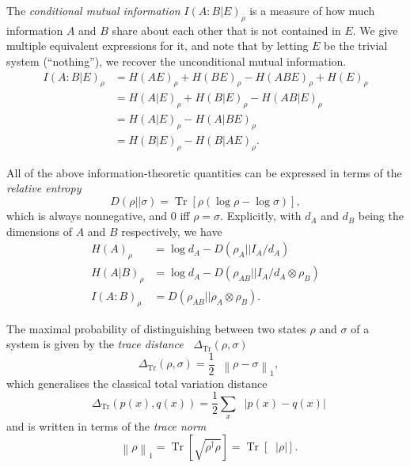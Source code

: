 \documentclass[10pt, a4paper]{article}
\numberwithin{equation}{section} %
\theoremstyle{definition}
\theoremstyle{plain}
\newcommand{\norm}[1]{\mathop{}\left\lVert#1\right\rVert}
\newcommand{\abs}[1]{\mathop{}\left\lvert#1\right\rvert}
\newcommand{\?}{\mathrel{?}} %
\newcommand{\Tr}[2][]{\mathop{\mathrm{Tr}#1}\left[ #2 \right]} %
\newcommand{\Trdist}[2]{\mathop{}\Delta_\mathrm{Tr}\left(#1, #2\right)}
\begin{document}
\begin{appendices}
                  The \emph{conditional mutual information} \(I{(A:B|E)}_{\rho}\) is a measure of how much information \(A\) and \(B\) share about each other that is not contained in \(E\). We give multiple equivalent expressions for it, and note that by letting \(E\) be the trivial system (``nothing''), we recover the unconditional mutual information.
                    \begin{align}
                      I{(A:B|E)}_{\rho} &= H{(AE)}_{\rho} + H{(BE)}_{\rho} - H{(ABE)}_{\rho} + H{(E)}_{\rho} \\
                                        &= H{(A|E)}_{\rho} + H{(B|E)}_{\rho} - H{(AB|E)}_{\rho} \\
                                        &= H{(A|E)}_{\rho} - H{(A|BE)}_{\rho} \\
                                        &= H{(B|E)}_{\rho} - H{(B|AE)}_{\rho}.
                    \end{align}

                  All of the above information-theoretic quantities can be expressed in terms of the \emph{relative entropy}
                  \begin{equation}
                    D(\rho||\sigma) = \Tr{ \rho (\log \rho - \log \sigma) },
                  \end{equation}
                  which is always nonnegative, and 0 iff \(\rho = \sigma\). Explicitly, with \(d_A\) and \(d_B\) being the dimensions of \(A\) and \(B\) respectively, we have
                  \begin{align}
                    H{(A)}_{\rho} &= \log d_A - D(\rho_A || I_A/d_A) \\
                    H{(A|B)}_{\rho} &= \log d_A - D(\rho_{AB} || I_A/d_A \otimes \rho_B) \\
                    I{(A:B)}_{\rho} &= D(\rho_{AB} || \rho_A \otimes \rho_B).
                  \end{align}

      The maximal probability of distinguishing between two states \(\rho\) and \(\sigma\) of a system is given by the \emph{trace distance} \(\Trdist{\rho}{\sigma}\) 
      \begin{equation}
      \Trdist{\rho}{\sigma} = \frac{1}{2}\norm{\rho - \sigma}_1,
      \end{equation}
      which generalises the classical total variation distance
      \[ \Trdist{p(x)}{q(x)} = \frac{1}{2} \sum_{x} \abs{p(x)-q(x)} \]
      and is written in terms of the \emph{trace norm}
      \begin{equation}
        \norm{\rho}_1 = \Tr{ \sqrt{\rho^{\dagger}\rho} } = \Tr{\abs{\rho}}.
      \end{equation}


\end{appendices}
\end{document}

